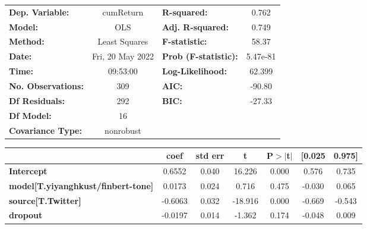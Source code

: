 \begin{center}
\begin{tabular}{lclc}
\toprule
\textbf{Dep. Variable:}                    &    cumReturn     & \textbf{  R-squared:         } &     0.762   \\
\textbf{Model:}                            &       OLS        & \textbf{  Adj. R-squared:    } &     0.749   \\
\textbf{Method:}                           &  Least Squares   & \textbf{  F-statistic:       } &     58.37   \\
\textbf{Date:}                             & Fri, 20 May 2022 & \textbf{  Prob (F-statistic):} &  5.47e-81   \\
\textbf{Time:}                             &     09:53:00     & \textbf{  Log-Likelihood:    } &    62.399   \\
\textbf{No. Observations:}                 &         309      & \textbf{  AIC:               } &    -90.80   \\
\textbf{Df Residuals:}                     &         292      & \textbf{  BIC:               } &    -27.33   \\
\textbf{Df Model:}                         &          16      & \textbf{                     } &             \\
\textbf{Covariance Type:}                  &    nonrobust     & \textbf{                     } &             \\
\bottomrule
\end{tabular}
\begin{tabular}{lcccccc}
                                           & \textbf{coef} & \textbf{std err} & \textbf{t} & \textbf{P$> |$t$|$} & \textbf{[0.025} & \textbf{0.975]}  \\
\midrule
\textbf{Intercept}                         &       0.6552  &        0.040     &    16.226  &         0.000        &        0.576    &        0.735     \\
\textbf{model[T.yiyanghkust/finbert-tone]} &       0.0173  &        0.024     &     0.716  &         0.475        &       -0.030    &        0.065     \\
\textbf{source[T.Twitter]}                 &      -0.6063  &        0.032     &   -18.916  &         0.000        &       -0.669    &       -0.543     \\
\textbf{dropout}                           &      -0.0197  &        0.014     &    -1.362  &         0.174        &       -0.048    &        0.009     \\

\end{tabular}
\end{center}
